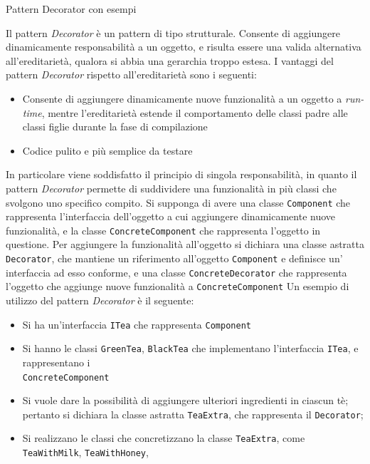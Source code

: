 \begin{problem}{1.21}
Pattern Decorator con esempi
\end{problem}
\begin{solution}
Il pattern \textit{Decorator} è un pattern di tipo strutturale.
Consente di aggiungere dinamicamente responsabilità a un oggetto, e risulta essere una valida alternativa all'ereditarietà, qualora si abbia una gerarchia troppo estesa.
I vantaggi del pattern \textit{Decorator} rispetto all'ereditarietà sono i seguenti:
\begin{itemize}
	\item Consente di aggiungere dinamicamente nuove funzionalità a un oggetto a \textit{run-time}, mentre l'ereditarietà estende il comportamento delle classi padre alle classi figlie durante la fase di compilazione
	\item Codice pulito e più semplice da testare
\end{itemize}
In particolare viene soddisfatto il principio di singola responsabilità, in quanto il pattern \textit{Decorator} permette di suddividere una funzionalità in più classi che svolgono uno specifico compito.
\newline
Si supponga di avere una classe \texttt{Component} che rappresenta l'interfaccia dell'oggetto a cui aggiungere dinamicamente nuove funzionalità, e la classe \texttt{ConcreteComponent} che rappresenta l'oggetto in questione.
Per aggiungere la funzionalità all'oggetto si dichiara una classe astratta \texttt{Decorator}, che mantiene un riferimento all'oggetto \texttt{Component} e definisce un' interfaccia ad esso conforme, e una classe \texttt{ConcreteDecorator} che rappresenta l'oggetto che aggiunge nuove funzionalità a \texttt{ConcreteComponent}
Un esempio di utilizzo del pattern \textit{Decorator} è il seguente:
\begin{itemize}
\item Si ha un'interfaccia \texttt{ITea} che rappresenta \texttt{Component}
\item Si hanno le classi \texttt{GreenTea}, \texttt{BlackTea} che implementano l'interfaccia \texttt{ITea}, e rappresentano i
\\
\texttt{ConcreteComponent}
\item Si vuole dare la possibilità di aggiungere ulteriori ingredienti in ciascun tè; pertanto si dichiara la classe astratta \texttt{TeaExtra}, che rappresenta il \texttt{Decorator};
\item Si realizzano le classi che concretizzano la classe \texttt{TeaExtra}, come \texttt{TeaWithMilk}, \texttt{TeaWithHoney},

\end{itemize}
\end{solution}
